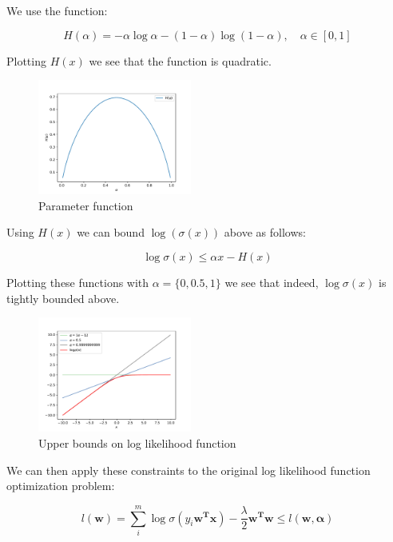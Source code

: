 \documentclass[11pt]{amsart}
\newcommand{\vek}[1]{\mathbf{#1}}
\begin{document}
We use the function:

\begin{equation}
H(\alpha) = -\alpha\log\alpha - (1-\alpha)\log(1-\alpha), \quad \alpha \in [0, 1]
\end{equation}

Plotting $H(x)$ we see that the function is quadratic.

\begin{figure}[h]
	\centering
	\includegraphics[width=0.45\textwidth]{H_x.pdf}
	\caption{Parameter function}
\end{figure}

Using $H(x)$ we can bound $\log(\sigma(x))$ above as follows:

\begin{equation}
\log\sigma(x) \leq \alpha x - H(x)
\end{equation} 

Plotting these functions with $\alpha = \{0, 0.5, 1\}$ we see that indeed, $\log\sigma(x)$ is tightly bounded above.

\begin{figure}
\includegraphics[width=0.45\textwidth]{bounds.pdf}
\caption{Upper bounds on log likelihood function}
\end{figure}

We can then apply these constraints to the original log likelihood function optimization problem:

\begin{equation}
l(\vek{w}) = \sum_{i}^{m} \log \sigma(y_i\vek{w^T}\vek{x}) - \frac{\lambda}{2}\vek{w^T}\vek{w} \leq l(\vek{w}, \vek{\alpha})
\end{equation}
\end{document}
